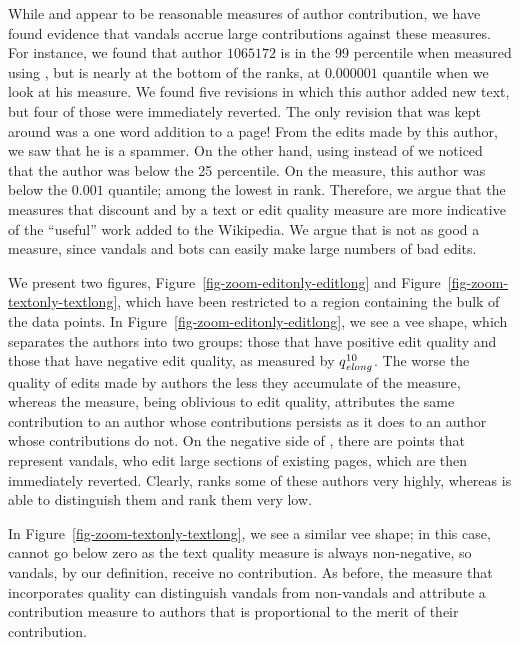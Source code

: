 While \textonly and \editonly appear to be reasonable measures 
of author contribution, we have found evidence that vandals
accrue large contributions against these measures.
For instance, we found that author $1065172$ is in the 99
percentile when measured using \textonly, but is nearly at the
bottom of the ranks, at $0.000001$ quantile when we look at his
\punish measure.
We found five revisions in which this author added new text, but
four of those were immediately reverted.
The only revision that was kept around was a one word addition to a
page!
From the edits made by this author, we saw that he is a spammer.
On the other hand, using \textlong instead of \textonly we
noticed that the author was below the 25 percentile.
On the \editlong measure, this author was below the 
$0.001$ quantile; among the lowest in rank.
Therefore, we argue that the measures that discount \textonly and 
\editonly by a text or edit quality measure are more indicative
of the ``useful'' work added to the Wikipedia.
We argue that \numedits is not as good a measure, since 
vandals and bots can easily make large numbers of bad edits.

We present two figures, Figure~\ref{fig-zoom-editonly-editlong}
and Figure~\ref{fig-zoom-textonly-textlong},
which have been restricted to a region containing the
bulk of the data points.
In Figure~\ref{fig-zoom-editonly-editlong},
we see a vee shape, which separates the authors into
two groups: those that have positive edit quality and those
that have negative edit quality, as measured by $\quality{elong}{10}{}$.
The worse the quality of edits made by authors the less they
accumulate of the \editlong measure, whereas the \editonly
measure, being oblivious to edit quality, attributes the same
contribution to an author whose contributions persists as it 
does to an author whose contributions do not.
On the negative side of \editlong, there are points that represent
vandals, who edit large sections of existing pages, which are
then immediately reverted.
Clearly, \editonly ranks some of these authors very highly,
whereas \editlong is able to distinguish them and rank
them very low.

In Figure~\ref{fig-zoom-textonly-textlong},
we see a similar vee shape; in this case, \textlong
cannot go below zero as the text quality measure is always 
non-negative, so vandals, by our definition, receive no 
contribution.
As before, the measure that incorporates quality can 
distinguish vandals from non-vandals and attribute a contribution
measure to authors that is proportional to the merit of their
contribution.

